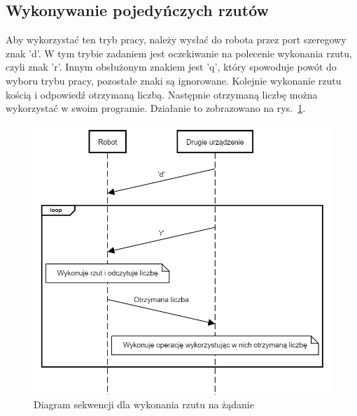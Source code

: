 \subsection{Wykonywanie pojedyńczych rzutów}
Aby wykorzystać ten tryb pracy, należy wysłać do robota przez port szeregowy znak 'd'.
W tym trybie zadaniem jest oczekiwanie na polecenie wykonania rzutu, czyli znak 'r'.
Innym obsłużonym znakiem jest 'q', który spowoduje powót do wyboru trybu pracy, pozostałe znaki są ignorowane. %
Kolejnie wykonanie rzutu kością i odpowiedź otrzymaną liczbą. Następnie otrzymaną 
liczbę można wykorzystać w swoim programie. Działanie to zobrazowano na rys.~\ref{fig:interface_b}.

\begin{figure}[H]
    \centering
    \includegraphics[width=0.5\linewidth]{chapters/05-Przetwarzanie Wyniku/figures/InterfaceB}
    \caption{Diagram sekwencji dla wykonania rzutu na żądanie}
    \label{fig:interface_b}
\end{figure}

